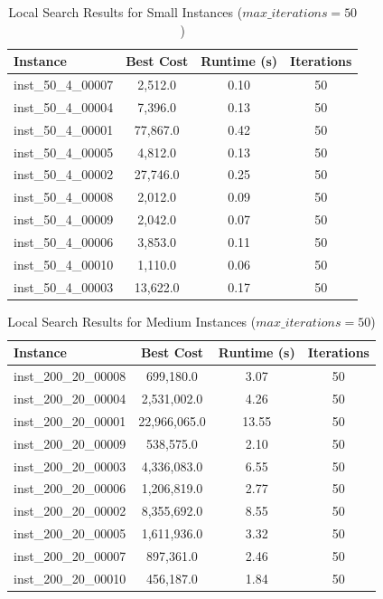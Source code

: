 \documentclass{article}
\begin{document}
\begin{table}[H]
\centering
\caption{Local Search Results for Small Instances ($max\_iterations = 50$)}
\begin{tabular}{lccc}
\toprule
\textbf{Instance} & \textbf{Best Cost} & \textbf{Runtime (s)} & \textbf{Iterations} \\
\midrule
inst\_50\_4\_00007 & 2,512.0  & 0.10 & 50 \\
inst\_50\_4\_00004 & 7,396.0  & 0.13 & 50 \\
inst\_50\_4\_00001 & 77,867.0 & 0.42 & 50 \\
inst\_50\_4\_00005 & 4,812.0  & 0.13 & 50 \\
inst\_50\_4\_00002 & 27,746.0 & 0.25 & 50 \\
inst\_50\_4\_00008 & 2,012.0  & 0.09 & 50 \\
inst\_50\_4\_00009 & 2,042.0  & 0.07 & 50 \\
inst\_50\_4\_00006 & 3,853.0  & 0.11 & 50 \\
inst\_50\_4\_00010 & 1,110.0  & 0.06 & 50 \\
inst\_50\_4\_00003 & 13,622.0 & 0.17 & 50 \\
\bottomrule
\end{tabular}
\label{tab:small_instance_results}
\end{table}

\begin{table}[H]
\centering
\caption{Local Search Results for Medium Instances ($max\_iterations = 50$)}
\begin{tabular}{lccc}
\toprule
\textbf{Instance} & \textbf{Best Cost} & \textbf{Runtime (s)} & \textbf{Iterations} \\
\midrule
inst\_200\_20\_00008 & 699,180.0    & 3.07  & 50 \\
inst\_200\_20\_00004 & 2,531,002.0  & 4.26  & 50 \\
inst\_200\_20\_00001 & 22,966,065.0 & 13.55 & 50 \\
inst\_200\_20\_00009 & 538,575.0    & 2.10  & 50 \\
inst\_200\_20\_00003 & 4,336,083.0  & 6.55  & 50 \\
inst\_200\_20\_00006 & 1,206,819.0  & 2.77  & 50 \\
inst\_200\_20\_00002 & 8,355,692.0  & 8.55  & 50 \\
inst\_200\_20\_00005 & 1,611,936.0  & 3.32  & 50 \\
inst\_200\_20\_00007 & 897,361.0    & 2.46  & 50 \\
inst\_200\_20\_00010 & 456,187.0    & 1.84  & 50 \\
\bottomrule
\end{tabular}
\label{tab:medium_instance_results}
\end{table}
\end{document}
